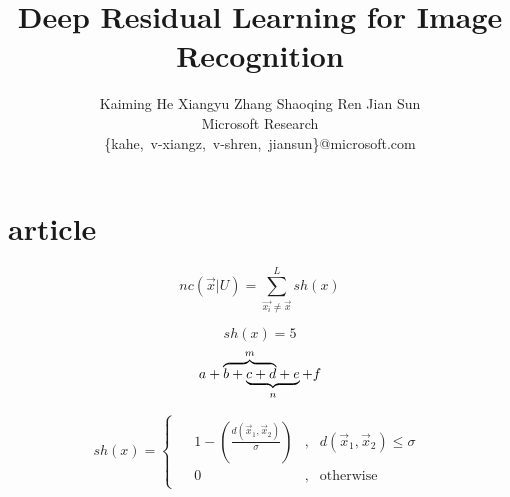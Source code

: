 \documentclass[10pt,twocolumn,letterpaper]{article}
\begin{document}
\title{Deep Residual Learning for Image Recognition}



\author{Kaiming He \qquad Xiangyu Zhang \qquad Shaoqing Ren \qquad Jian Sun \\
\large Microsoft Research \vspace{-.2em}\\
\normalsize
\{kahe,~v-xiangz,~v-shren,~jiansun\}@microsoft.com
}

\maketitle

\begin{abstract}
\vspace{-.5em}

\end{abstract}




\vspace{-1em}
\section{article}
$$nc(\vec{x}|U)=\sum_{\vec{x_i}\neq
\vec x}^L sh(x)$$

$$sh(x) = 5$$
\[
a+\rlap{$\overbrace{\phantom{b+c+d}}^m$}
b+\underbrace{c+d+e}_n+f
\]

\[
sh(x)=\left\{\begin{gathered} \begin{aligned}
	&1-(\frac{d(\vec x_1,\vec x_2)}{\sigma}) &, &d(\vec x_1,\vec x_2) \leq \sigma \\
	&0 &, &\text{otherwise}
	\end{aligned} \end{gathered}
	\right .	
	\]
\end{document}
